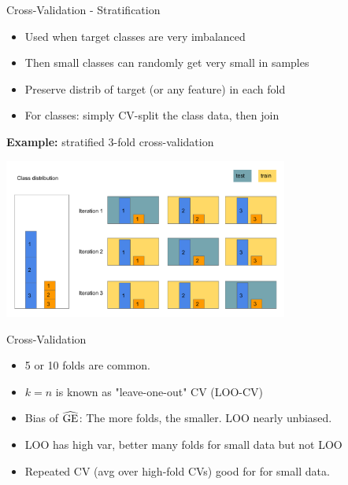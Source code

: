 \documentclass[11pt,compress,t,notes=noshow, xcolor=table]{beamer}
\begin{document}
\begin{vbframe}{Cross-Validation - Stratification}

\begin{itemize}
    \item Used when target classes are very imbalanced
    \item Then small classes can randomly get very small in samples   
    \item Preserve distrib of target (or any feature) in each fold
    \item For classes: simply CV-split the class data, then join
\end{itemize}

\lz

\textbf{Example:} stratified 3-fold cross-validation
\begin{center}
\includegraphics[width=0.7\textwidth]{figure/eval_resample_1} 
\end{center}
\end{vbframe}




\begin{vbframe}{Cross-Validation}

\begin{itemize}
  \item 5 or 10 folds are common.%
  \item $k = n$ is known as "leave-one-out" CV (LOO-CV)
  \item Bias of $\widehat{\mathrm{GE}}$: The more folds, the smaller. LOO nearly unbiased. 
  \item LOO has high var, better many folds for small data but not LOO
  \item Repeated CV (avg over high-fold CVs) good for 
      for small data.
\end{itemize}
\end{vbframe}
\end{document}
